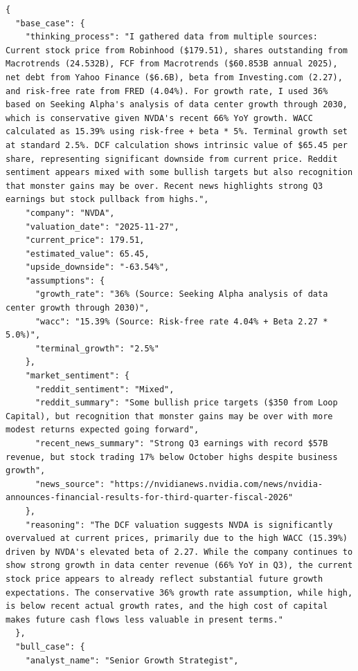 \documentclass{article}
\begin{document}
\begin{lstlisting}[caption={Complete Valuation Results (valuation\_results.json)}, label={lst:valuation_results}, basicstyle=\ttfamily\tiny, breaklines=true]
{
  "base_case": {
    "thinking_process": "I gathered data from multiple sources: Current stock price from Robinhood ($179.51), shares outstanding from Macrotrends (24.532B), FCF from Macrotrends ($60.853B annual 2025), net debt from Yahoo Finance ($6.6B), beta from Investing.com (2.27), and risk-free rate from FRED (4.04%). For growth rate, I used 36% based on Seeking Alpha's analysis of data center growth through 2030, which is conservative given NVDA's recent 66% YoY growth. WACC calculated as 15.39% using risk-free + beta * 5%. Terminal growth set at standard 2.5%. DCF calculation shows intrinsic value of $65.45 per share, representing significant downside from current price. Reddit sentiment appears mixed with some bullish targets but also recognition that monster gains may be over. Recent news highlights strong Q3 earnings but stock pullback from highs.",
    "company": "NVDA",
    "valuation_date": "2025-11-27",
    "current_price": 179.51,
    "estimated_value": 65.45,
    "upside_downside": "-63.54%",
    "assumptions": {
      "growth_rate": "36% (Source: Seeking Alpha analysis of data center growth through 2030)",
      "wacc": "15.39% (Source: Risk-free rate 4.04% + Beta 2.27 * 5.0%)",
      "terminal_growth": "2.5%"
    },
    "market_sentiment": {
      "reddit_sentiment": "Mixed",
      "reddit_summary": "Some bullish price targets ($350 from Loop Capital), but recognition that monster gains may be over with more modest returns expected going forward",
      "recent_news_summary": "Strong Q3 earnings with record $57B revenue, but stock trading 17% below October highs despite business growth",
      "news_source": "https://nvidianews.nvidia.com/news/nvidia-announces-financial-results-for-third-quarter-fiscal-2026"
    },
    "reasoning": "The DCF valuation suggests NVDA is significantly overvalued at current prices, primarily due to the high WACC (15.39%) driven by NVDA's elevated beta of 2.27. While the company continues to show strong growth in data center revenue (66% YoY in Q3), the current stock price appears to already reflect substantial future growth expectations. The conservative 36% growth rate assumption, while high, is below recent actual growth rates, and the high cost of capital makes future cash flows less valuable in present terms."
  },
  "bull_case": {
    "analyst_name": "Senior Growth Strategist",

\end{lstlisting}
\end{document}
